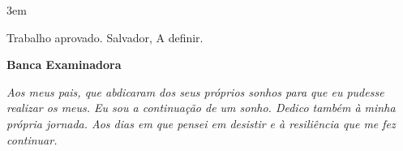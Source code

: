 \documentclass[
	oneside,
	a4paper,
	12pt,
	chapter=TITLE,
	section=TITLE,
	english,
	brazilian
]{abntex2}
\def\MakeUppercase#1{#1}%
\begin{document}
\frenchspacing
{}
\emergencystretch 3em
\hfuzz 1pt


\imprimircapa
\imprimirfolhaderosto


\begin{folhadeaprovacao}
  \begin{center}
    {\fontsize{14}{16}\selectfont\bfseries\MakeUppercase{\imprimirautor}\par}
    \vspace{1.5cm}
    {\fontsize{16}{18}\selectfont\bfseries\MakeUppercase{\imprimirtitulo}%
    \ifx\imprimirsubtitulo\empty\else{: \fontsize{14}{16}\selectfont\MakeUppercase{\imprimirsubtitulo}}\fi\par}
  \end{center}
  \vspace{1cm}
  \begin{flushright}
    \begin{minipage}{0.55\textwidth}
      \SingleSpacing\fontsize{11}{13}\selectfont
      \imprimirpreambulo
    \end{minipage}
  \end{flushright}
  \vspace{1cm}
  \noindent Trabalho aprovado. Salvador, A definir.
  \vspace{0.8cm}
  \begin{center}
    \bfseries Banca Examinadora
  \end{center}

\end{folhadeaprovacao}


\begin{dedicatoria}
  \vspace*{\fill}
  \begin{flushright}
    \noindent\textit{Aos meus pais, que abdicaram dos seus próprios sonhos para que eu pudesse realizar os meus. Eu sou a continuação de um sonho. Dedico também à minha própria jornada. Aos dias em que pensei em desistir e à resiliência que me fez continuar.}
  \end{flushright}
  \vspace*{2cm}
\end{dedicatoria}
\end{document}
